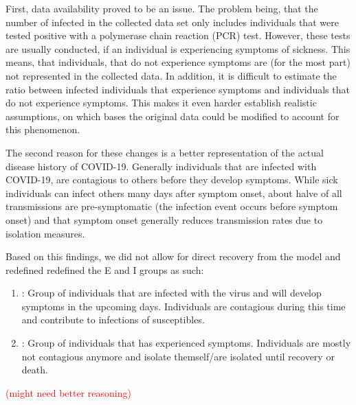 \par
First, data availability proved to be an issue. The problem being, that the number of infected in the
collected data set only includes individuals that were tested positive with a polymerase chain reaction (PCR) test\cite{??}. However,
these tests are usually conducted, if an individual is experiencing symptoms of sickness\cite{??}. This means, that individuals, that do
not experience symptoms are (for the most part) not represented in the collected data. In addition, it is difficult to estimate
the ratio between infected individuals that experience symptoms and individuals that do not experience symptoms. This makes it
even harder establish realistic assumptions, on which bases the original data could be modified to account for this phenomenon.\newline

\par
The second reason for these changes is a better representation of the actual disease history of COVID-19. Generally individuals that
are infected with COVID-19, are contagious to others before they develop symptoms. While sick individuals can infect others many
days after symptom onset, about halve of all transmissions are pre-symptomatic (the infection event occurs before symptom onset)
\cite{casey2021presymptomatic} and that symptom onset generally reduces transmission rates due to isolation measures\cite{RKIcov}.

\par
Based on this findings, we did not allow for direct recovery from the model and redefined redefined the E and I groups as such: 
\begin{enumerate}[label=$\bullet$]
	\item {}: Group of individuals that are infected with the virus and will develop symptoms in the upcoming
		days. Individuals are contagious during this time and contribute to infections of susceptibles.
	\item {}: Group of individuals that has experienced symptoms. Individuals are mostly not contagious anymore
		and isolate themself/are isolated until recovery or death.
\end{enumerate}

\textcolor{red}{(might need better reasoning)} %


